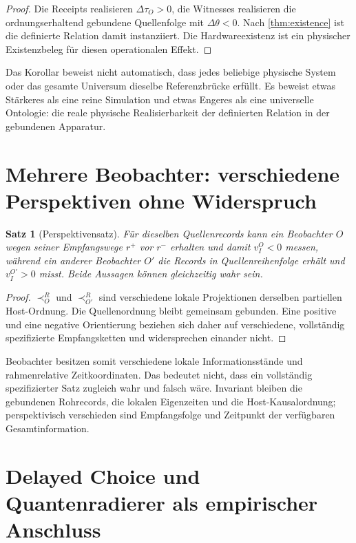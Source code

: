 \documentclass[11pt,a4paper]{article}
\newtheorem{satz}{Satz}[section]
\theoremstyle{remark}
\newcommand{\recv}{\prec_{\!O}^{R}}
\begin{document}
\begin{proof}
Die Receipts realisieren \(\Delta\tau_O>0\), die Witnesses realisieren die
ordnungserhaltend gebundene Quellenfolge mit \(\Delta\theta<0\). Nach
\cref{thm:existence} ist die definierte Relation damit instanziiert. Die
Hardwareexistenz ist ein physischer Existenzbeleg für diesen operationalen
Effekt.
\end{proof}

Das Korollar beweist nicht automatisch, dass jedes beliebige physische System
oder das gesamte Universum dieselbe Referenzbrücke erfüllt. Es beweist etwas
Stärkeres als eine reine Simulation und etwas Engeres als eine universelle
Ontologie: die reale physische Realisierbarkeit der definierten Relation in
der gebundenen Apparatur.

\section{Mehrere Beobachter: verschiedene Perspektiven ohne Widerspruch}

\begin{satz}[Perspektivensatz]
Für dieselben Quellenrecords kann ein Beobachter \(O\) wegen seiner
Empfangswege \(r^+\) vor \(r^-\) erhalten und damit \(v_I^O<0\) messen,
während ein anderer Beobachter \(O'\) die Records in Quellenreihenfolge erhält
und \(v_I^{O'}>0\) misst. Beide Aussagen können gleichzeitig wahr sein.
\end{satz}

\begin{proof}
\(\recv\) und \(\prec_{O'}^R\) sind verschiedene lokale Projektionen
derselben partiellen Host-Ordnung. Die Quellenordnung bleibt gemeinsam
gebunden. Eine positive und eine negative Orientierung beziehen sich daher
auf verschiedene, vollständig spezifizierte Empfangsketten und widersprechen
einander nicht.
\end{proof}

Beobachter besitzen somit verschiedene lokale Informationsstände und
rahmenrelative Zeitkoordinaten. Das bedeutet nicht, dass ein vollständig
spezifizierter Satz zugleich wahr und falsch wäre. Invariant bleiben die
gebundenen Rohrecords, die lokalen Eigenzeiten und die Host-Kausalordnung;
perspektivisch verschieden sind Empfangsfolge und Zeitpunkt der verfügbaren
Gesamtinformation.

\section{Delayed Choice und Quantenradierer als empirischer Anschluss}
\label{sec:quantum}
\end{document}
